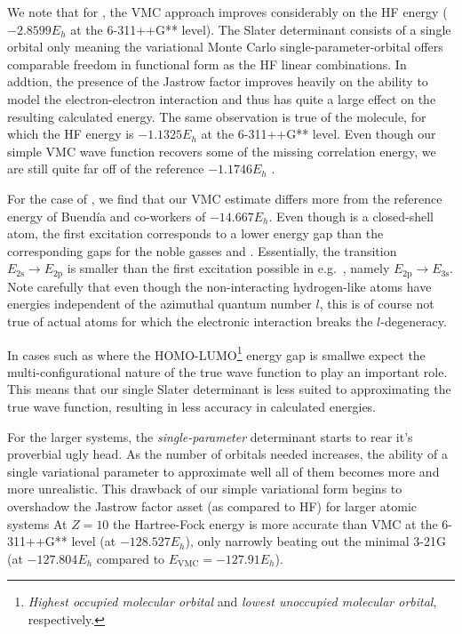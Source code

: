\documentclass[../../master.tex]{subfiles}
\begin{document}
We note that for , the VMC approach improves considerably on the HF energy ($-2.8599 E_h$ at the 6-311++G** level). The Slater determinant consists of a single orbital only meaning the variational Monte Carlo single-parameter-orbital offers comparable freedom in functional form as the HF linear combinations. In addtion, the presence of the Jastrow factor improves heavily on the ability to model the electron-electron interaction and thus has quite a large effect on the resulting calculated energy. The same observation is true of the  molecule, for which the HF energy is $-1.1325 E_h$ at the 6-311++G** level. Even though our simple VMC wave function recovers some of the missing correlation energy, we are still quite far off of the reference $-1.1746 E_h$ \cite{moskowitz1981new}.

For the case of , we find that our VMC estimate differs more from the reference energy of Buendía and co-workers of $-14.667 E_h$. Even though  is a closed-shell atom, the first excitation corresponds to a lower energy gap than the corresponding gaps for the noble gasses  and . Essentially, the transition $E_\text{2s}\rightarrow E_\text{2p}$ is smaller than the first excitation possible in e.g.\ , namely $E_\text{2p}\rightarrow E_\text{3s}$. Note carefully that even though the non-interacting hydrogen-like atoms have energies independent of the azimuthal quantum number $l$, this is of course not true of actual atoms for which the electronic interaction breaks the $l$-degeneracy.  

In cases such as \textemdash where the HOMO-LUMO\footnote{\emph{Highest occupied molecular orbital} and \emph{lowest unoccupied molecular orbital}, respectively.} energy gap is small\textemdash we expect the multi-configurational nature of the true wave function to play an important role. This means that our single Slater determinant is less suited to approximating the true wave function, resulting in less accuracy in calculated energies.

For the larger systems, the \emph{single-parameter} determinant starts to rear it's proverbial ugly head. As the number of orbitals needed increases, the ability of a single variational parameter to approximate well all of them becomes more and more unrealistic. This drawback of our simple variational form begins to overshadow the Jastrow factor asset (as compared to HF) for larger atomic systems At $Z=10$ the Hartree-Fock energy is more accurate than VMC at the 6-311++G** level (at $-128.527 E_h$), only narrowly beating out the minimal 3-21G (at $-127.804 E_h$ compared to $E_\text{VMC}=-127.91 E_h$).
\end{document}

